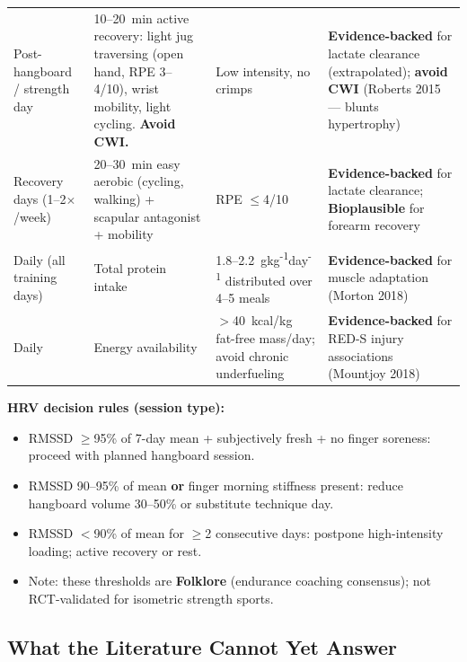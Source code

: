\begin{center}
\begin{longtable}{>{\raggedright}p{3.2cm} >{\raggedright}p{3.5cm} >{\raggedright}p{3.0cm} >{\raggedright\arraybackslash}p{5.5cm}}
Post-hangboard / strength day & 10--20~min active recovery: light jug traversing (open hand, RPE 3--4/10), wrist mobility, light cycling. \textbf{Avoid CWI.} & Low intensity, no crimps & \textbf{Evidence-backed} for lactate clearance (extrapolated); \textbf{avoid CWI} (Roberts 2015 --- blunts hypertrophy) \\

Recovery days (1--2$\times$/week) & 20--30~min easy aerobic (cycling, walking) + scapular antagonist + mobility & RPE $\leq$4/10 & \textbf{Evidence-backed} for lactate clearance; \textbf{Bioplausible} for forearm recovery \\

Daily (all training days) & Total protein intake & 1.8--2.2~g\textperiodcentered{}kg\textsuperscript{-1}\textperiodcentered{}day\textsuperscript{-1} distributed over 4--5 meals & \textbf{Evidence-backed} for muscle adaptation (Morton 2018) \\

Daily & Energy availability & $>$40~kcal/kg fat-free mass/day; avoid chronic underfueling & \textbf{Evidence-backed} for RED-S injury associations (Mountjoy 2018) \\

\end{longtable}
\end{center}

\textbf{HRV decision rules (session type):}
\begin{itemize}[noitemsep]
  \item RMSSD $\geq$95\% of 7-day mean + subjectively fresh + no finger soreness: proceed with planned hangboard session.
  \item RMSSD 90--95\% of mean \textbf{or} finger morning stiffness present: reduce hangboard volume 30--50\% or substitute technique day.
  \item RMSSD $<$90\% of mean for $\geq$2 consecutive days: postpone high-intensity loading; active recovery or rest.
  \item Note: these thresholds are \textbf{Folklore} (endurance coaching consensus); not RCT-validated for isometric strength sports.
\end{itemize}

\subsection{What the Literature Cannot Yet Answer}

